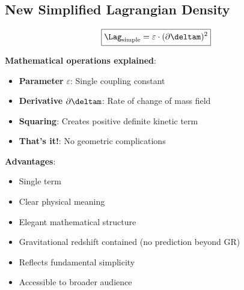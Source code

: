 	\subsection{New Simplified Lagrangian Density}
	
	\begin{equation}
		\boxed{\Lag_{\text{simple}} = \varepsilon \cdot (\partial \deltam)^2}
	\end{equation}
	
	\textbf{Mathematical operations explained}:
	\begin{itemize}
		\item \textbf{Parameter} $\varepsilon$: Single coupling constant
		\item \textbf{Derivative} $\partial \deltam$: Rate of change of mass field
		\item \textbf{Squaring}: Creates positive definite kinetic term
		\item \textbf{That's it!}: No geometric complications
	\end{itemize}
	
	\textbf{Advantages}:
	\begin{itemize}
		\item Single term
		\item Clear physical meaning
		\item Elegant mathematical structure
		\item Gravitational redshift contained (no prediction beyond GR)
		\item Reflects fundamental simplicity
		\item Accessible to broader audience
	\end{itemize}
	
	\begin{table}[htbp]
		\centering
		\caption{Comparison of complex and simple Lagrangian density}
		\label{tab:complexity_comparison}
	\end{table}
	

